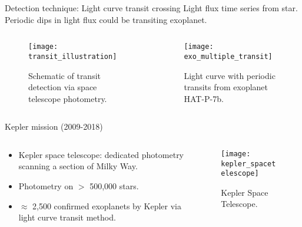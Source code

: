 \documentclass{beamer}
\begin{document}
\begin{frame}{Detection technique: Light curve transit crossing}
	Light flux time series from star.  Periodic dips in light flux could be transiting exoplanet.
	
	\begin{columns}
		\begin{column}{0.5\textwidth}
			\begin{figure}
				\texttt{[image: transit\_illustration]}
				\caption{Schematic of transit detection via space telescope photometry.}
			\end{figure}
		\end{column}
		\begin{column}{0.5\textwidth}
			\begin{figure}
				\texttt{[image: exo\_multiple\_transit]}
				\caption{Light curve with periodic transits from exoplanet HAT-P-7b.}
			\end{figure}
	\end{column}

		
	\end{columns}	
\end{frame}

\begin{frame}{Kepler mission (2009-2018)}
	\begin{columns}
		\begin{column}{0.4\textwidth}
			\begin{itemize}
				\item Kepler space telescope: dedicated photometry scanning a section of Milky Way.
				\item Photometry on $>$ 500,000 stars.
				\item $\approx$ 2,500 confirmed exoplanets by Kepler via light curve transit method.
			\end{itemize}	
		\end{column}	
		\begin{column}{0.6\textwidth}
			\begin{figure}
				\texttt{[image: kepler\_spacetelescope]}
				\caption{Kepler Space Telescope.}
			\end{figure}
		\end{column}
			
		\end{columns}	
\end{frame}
\end{document}
